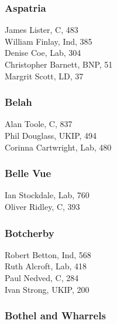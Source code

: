 \documentclass[a4paper,openany,10pt]{book}
\begin{document}
\subsubsection*{Aspatria}



James Lister, C, 483\\
William Finlay, Ind, 385\\
Denise Coe, Lab, 304\\
Christopher Barnett, BNP, 51\\
Margrit Scott, LD, 37\\


\subsubsection*{Belah}



Alan Toole, C, 837\\
Phil Douglass, UKIP, 494\\
Corinna Cartwright, Lab, 480\\


\subsubsection*{Belle Vue}



Ian Stockdale, Lab, 760\\
Oliver Ridley, C, 393\\


\subsubsection*{Botcherby}



Robert Betton, Ind, 568\\
Ruth Alcroft, Lab, 418\\
Paul Nedved, C, 284\\
Ivan Strong, UKIP, 200\\


\subsubsection*{Bothel and Wharrels}
\end{document}
